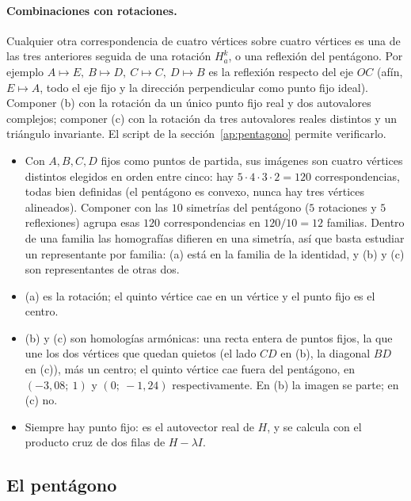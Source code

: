 \paragraph{Combinaciones con rotaciones.} Cualquier otra correspondencia de cuatro vértices
sobre cuatro vértices es una de las tres anteriores seguida de una rotación \(H_a^k\), o una
reflexión del pentágono. Por ejemplo \(A\mapsto E,\ B\mapsto D,\ C\mapsto C,\ D\mapsto B\)
es la reflexión respecto del eje \(OC\) (afín, \(E\mapsto A\), todo el eje fijo y la
dirección perpendicular como punto fijo ideal). Componer (b) con la rotación da un único punto
fijo real y dos autovalores complejos; componer (c) con la rotación da tres autovalores
reales distintos y un triángulo invariante. El script de la sección~\ref{ap:pentagono}
permite verificarlo.

\begin{resultado}
\begin{itemize}
  \item Con \(A,B,C,D\) fijos como puntos de partida, sus imágenes son cuatro vértices
  distintos elegidos en orden entre cinco: hay \(5\cdot4\cdot3\cdot2=120\) correspondencias,
  todas bien definidas (el pentágono es convexo, nunca hay tres vértices alineados). Componer
  con las \(10\) simetrías del pentágono (\(5\) rotaciones y \(5\) reflexiones) agrupa esas
  \(120\) correspondencias en \(120/10=12\) familias. Dentro de una familia las homografías
  difieren en una simetría, así que basta estudiar un representante por familia: (a) está en
  la familia de la identidad, y (b) y (c) son representantes de otras dos.
  \item (a) es la rotación; el quinto vértice cae en un vértice y el punto fijo es el centro.
  \item (b) y (c) son homologías armónicas: una recta entera de puntos fijos, la que une los
  dos vértices que quedan quietos (el lado \(CD\) en (b), la diagonal \(BD\) en (c)), más un
  centro; el quinto vértice cae fuera del pentágono, en
  \((-3{,}08;\ 1)\) y \((0;\ -1{,}24)\) respectivamente. En (b) la imagen se parte; en (c) no.
  \item Siempre hay punto fijo: es el autovector real de \(H\), y se calcula con el producto
  cruz de dos filas de \(H-\lambda I\).
\end{itemize}
\end{resultado}

\subsection{El pentágono}\label{cap:pentagono}\label{ap:pentagono}

